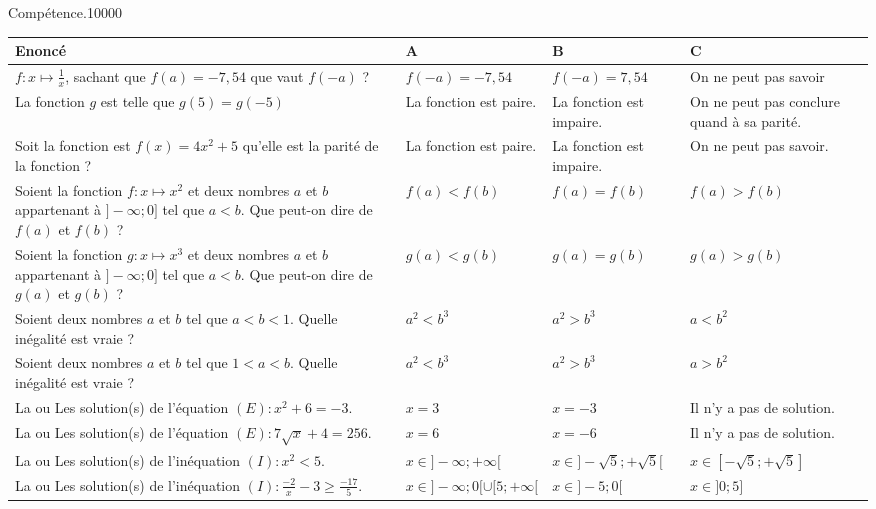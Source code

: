 \begin{pageAuto} %

\begin{ExoAutoN}{Compétence.}{1}{0}{0}{0}{0}
\vspace{.2cm}
\begin{tabular}{|M{.4\linewidth}|M{.17\linewidth}|M{.17\linewidth}|M{.17\linewidth}|}
\hline
Enoncé & A & B & C \\\hline
$f:x\mapsto \frac{1}{x}$, sachant que $f(a)=-7,54$ que vaut $f(-a)$ ? & $f(-a)=-7,54$ & $f(-a)=7,54$ & On ne peut pas savoir \\\hline
La fonction $g$ est telle que $g(5)=g(-5)$ & La fonction est paire. & La fonction est impaire. & On ne peut pas conclure quand à sa parité. \\\hline
Soit la fonction est $f(x)=4x^2+5$ qu'elle est la parité de la fonction ? & La fonction est paire. & La fonction est impaire. & On ne peut pas savoir. \\\hline
Soient la fonction $f:x\mapsto x^2$ et deux nombres $a$ et $b$ appartenant à $]-\infty;0]$ tel que $a<b$. Que peut-on dire de $f(a)$ et $f(b)$ ? & $f(a)<f(b)$ & $f(a)=f(b)$ & $f(a)>f(b)$ \\\hline
Soient la fonction $g:x\mapsto x^3$ et deux nombres $a$ et $b$ appartenant à $]-\infty;0]$ tel que $a<b$. Que peut-on dire de $g(a)$ et $g(b)$ ? & $g(a)<g(b)$ & $g(a)=g(b)$ & $g(a)>g(b)$ \\\hline
Soient deux nombres $a$ et $b$ tel que $a<b<1$. Quelle inégalité est vraie ? & $a^2<b^3$ & $a^2>b^3$ & $a<b^2$ \\\hline
Soient deux nombres $a$ et $b$ tel que $1<a<b$. Quelle inégalité est vraie ? & $a^2<b^3$ & $a^2>b^3$ & $a>b^2$ \\\hline
La ou Les solution(s) de l'équation $(E):x^2+6=-3$. & $x=3$ & $x=-3$ & Il n'y a pas de solution. \\\hline
La ou Les solution(s) de l'équation $(E):7\sqrt{x}+4=256$. & $x=6$ & $x=-6$ & Il n'y a pas de solution. \\\hline
La ou Les solution(s) de l'inéquation $(I):x^2<5$. & $x\in]-\infty;+\infty[$ & $x\in]-\sqrt{5};+\sqrt{5}[$ & $x\in[-\sqrt{5};+\sqrt{5}]$ \\\hline
La ou Les solution(s) de l'inéquation $(I):\frac{-2}{x}-3\geq\frac{-17}{5}$. & $x\in]-\infty;0[\cup[5;+\infty[$ & $x\in]-5;0[$ & $x\in]0;5]$ \\\hline
\end{tabular}
\end{ExoAutoN}

\end{pageAuto} %

